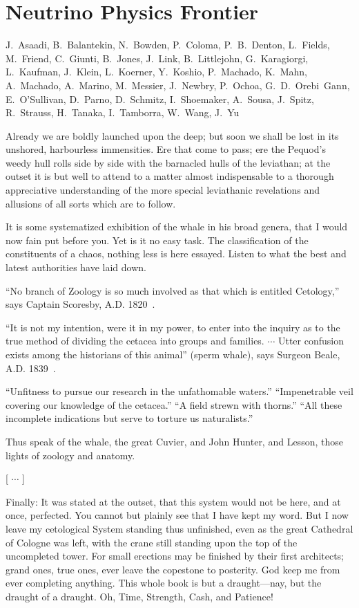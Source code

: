 
\setcounter{chapter}{2} 

\chapter{Neutrino Physics Frontier}

   {J.~Asaadi, B.~Balantekin, N.~Bowden, P.~Coloma, P.~B.~Denton, 
L.~Fields, M.~Friend,  C.~Giunti, B.~Jones,  J.~Link, B.~Littlejohn, G.~Karagiorgi,
L.~Kaufman,  J.~Klein, L.~Koerner, 
Y.~Koshio, P.~Machado,  K.~Mahn, A.~Machado,  A.~Marino, 
M.~Messier, J.~Newbry, P.~Ochoa, G.~D.~Orebi~Gann, E.~O'Sullivan, D.~Parno, 
D.~Schmitz,  I.~Shoemaker,  A.~Sousa,
J.~Spitz, R.~Strauss, H.~Tanaka, I.~Tamborra,  W.~Wang, J.~Yu}


Already we are boldly launched upon the deep; but soon we shall be lost in its unshored, harbourless immensities. Ere that come to pass; ere the Pequod’s weedy hull rolls side by side with the barnacled hulls of the leviathan; at the outset it is but well to attend to a matter almost indispensable to a thorough appreciative understanding of the more special leviathanic revelations and allusions of all sorts which are to follow.

It is some systematized exhibition of the whale in his broad genera, that I would now fain put before you. Yet is it no easy task. The classification of the constituents of a chaos, nothing less is here essayed. Listen to what the best and latest authorities have laid down.

``No branch of Zoology is so much involved as that which is entitled Cetology,'' says Captain Scoresby, A.D. 1820~\cite{N-Scoresby}.

``It is not my intention, were it in my power, to enter into the inquiry as to the true method of dividing the cetacea into groups and families. $\cdots$ Utter confusion exists among the historians of this animal'' (sperm whale), says Surgeon Beale, A.D. 1839~\cite{N-Beale}.

``Unfitness to pursue our research in the unfathomable waters.'' ``Impenetrable veil covering our knowledge of the cetacea.''  ``A field strewn with thorns.'' ``All these incomplete indications but serve to torture us naturalists.''

Thus speak of the whale, the great Cuvier, and John Hunter, and Lesson, those lights of zoology and anatomy.

[ $\cdots$ ]

Finally: It was stated at the outset, that this system would not be here, and at once, perfected. You cannot but plainly see that I have kept my word. But I now leave my cetological System standing thus unfinished, even as the great Cathedral of Cologne was left, with the crane still standing upon the top of the uncompleted tower. For small erections may be finished by their first architects; grand ones, true ones, ever leave the copestone to posterity. God keep me from ever completing anything. This whole book is but a draught---nay, but the draught of a draught. Oh, Time, Strength, Cash, and Patience!



